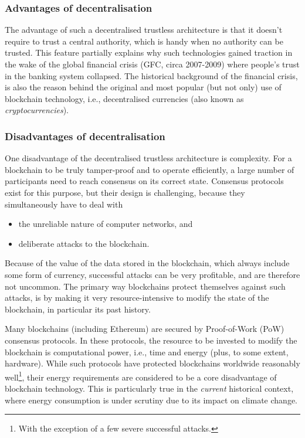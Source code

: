 \documentclass{article}
\begin{document}
\subsubsection{Advantages of decentralisation}

The advantage of such a decentralised trustless architecture is that it doesn't
require to trust a central authority, which is handy when no authority can be
trusted. This feature partially explains why such technologies gained traction
in the wake of the global financial crisis (GFC, circa 2007-2009) where
people's trust in the banking system collapsed. The historical background of
the financial crisis, is also the reason behind the original and most popular
(but not only) use of blockchain technology, i.e., decentralised currencies
(also known as \emph{cryptocurrencies}). 

\subsubsection{Disadvantages of decentralisation}

One disadvantage of the decentralised trustless architecture is complexity. For a
blockchain to be truly tamper-proof and to operate efficiently, a large number
of participants need to reach consensus on its correct state. Consensus protocols
exist for this purpose, but their design is challenging, because they
simultaneously have to deal with 

\begin{itemize}
  \item the unreliable nature of computer networks, and
  \item deliberate attacks to the blockchain.
\end{itemize}

Because of the value of the data stored in the blockchain, which always include
some form of currency, successful attacks can be very profitable, and are
therefore not uncommon. The primary way blockchains protect themselves against 
such attacks, is by making it very resource-intensive to modify the state of 
the blockchain, in particular its past history.

Many blockchains (including Ethereum) are secured by Proof-of-Work (PoW)
consensus protocols. In these protocols, the resource to be invested to modify
the blockchain is computational power, i.e., time and energy (plus, to some
extent, hardware). While such protocols have protected blockchains worldwide
reasonably well\footnote{With the exception of a few severe successful
attacks.}, their energy requirements are considered to be a core disadvantage
of blockchain technology. This is particularly true in the \emph{current}
historical context, where energy consumption is under scrutiny due to its
impact on climate change.
\end{document}
